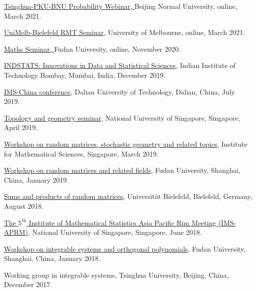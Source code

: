 \begin{item_list}
\item
  \href{http://math0.bnu.edu.cn/~hehui/webinar20210318.pdf}{Tsinghua-PKU-BNU Probability Webinar, } Beijing Normal University, online, March 2021.
\item
  \href{https://events.unimelb.edu.au/mathematics-and-statistics/event/9553-1}{UniMelb-Bielefeld RMT Seminar}, University of Melbourne, online, March 2021.
\item
  \href{https://math.fudan.edu.cn/show.aspx?info_lb=765&flag=527&info_id=7048}{Maths Seminar, } Fudan University, online, November 2020. 
\item
  \href{https://www.intindstat.org/iisaconference2019/}{INDSTATS: Innovations in Data and Statistical Sciences}, Indian Institute of Technology Bombay, Mumbai, India, December 2019.
\item
  \href{http://www.ims-china.org/}{IMS-China conference}, Dalian University of Technology, Dalian, China, July 2019.
\item
  \href{http://www.math.nus.edu.sg/seminars.aspx?CatID=5}{Topology and geometry seminar}, National University of Singapore, Singapore, April 2019.
\item
  \href{https://sites.google.com/view/randommatrices2019nus}{Workshop on random matrices, stochastic geometry and related topics}, Institute for Mathematical Sciences, Singapore, March 2019.
\item
  \href{http://math.fudan.edu.cn/show.aspx?info_lb=766&flag=527&info_id=6117}{Workshop on random matrices and related fields}, Fudan University, Shanghai, China, January 2019.
\item
  \href{https://www.uni-bielefeld.de/(en)/ZiF/AG/2018/08-27-Akemann.html}{Sums and products of random matrices}, Universit\"{a}t Bielefeld, Bielefeld, Germany, August 2018.
\item
  \href{https://ims-aprm2018.stat.nus.edu.sg/}{The $5^{\text{th}}$ Institute of Mathematical Statistics Asia Pacific Rim Meeting (IMS-APRM)}, National University of Singapore, Singapore, June 2018.
\item
  \href{http://math.fudan.edu.cn/en/Data/View/-99994362}{Workshop on integrable systems and orthogonal polynomials}, Fudan University, Shanghai, China, January 2018.
\item
  Working group in integrable systems, Tsinghua University, Beijing, China, December 2017.

\end{item_list}
